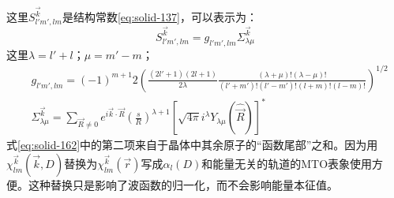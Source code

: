 这里$S_{l'm',lm}^{\vec k}$是结构常数\eqref{eq:solid-137}，可以表示为\cite{PRB12-3060_1975}：
\begin{equation}
  S_{l'm',lm}^{\vec k}=g_{l'm',lm}\Sigma_{\lambda\mu}^{\vec k}
  \label{eq:solid-163}
\end{equation}
这里$\lambda=l'+l$；$\mu=m'-m$；
\begin{displaymath}
  \begin{split}
    &g_{l'm',lm}=(-1)^{m+1}2\left(\frac{(2l'+1)(2l+1)}{2\lambda}\frac{(\lambda+\mu)!(\lambda-\mu)!}{(l'+m')!(l'-m')!(l+m)!(l-m)!}\right)^{1/2}\\
    &\Sigma_{\lambda\mu}^{\vec k}=\sum_{\vec R\neq0}e^{i\vec k\cdot\vec R}\left(\frac sR\right)^{\lambda+1}[\sqrt{4\pi}i^{\lambda}Y_{\lambda\mu}(\hat{\vec R})]^{\ast}
  \end{split}
\end{displaymath}
式\eqref{eq:solid-162}中的第二项来自于晶体中其余原子的“函数尾部”之和。因为用$\chi_{lm}^{\vec k}(\vec k,D)$替换为$\chi_{lm}^{\vec k}(\vec r)$写成$\alpha_l(D)$和能量无关的轨道的MTO表象使用方便。这种替换只是影响了波函数的归一化，而不会影响能量本征值。

